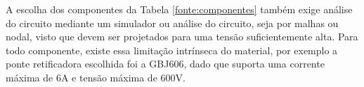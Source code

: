 \documentclass[a4paper,12pt,oneside,openany,table,xcdraw]{article}
\begin{document}
A escolha dos componentes da Tabela \ref{fonte:componentes} também exige análise do circuito mediante um simulador ou análise do circuito, seja por malhas ou nodal, visto que devem ser projetados para uma tensão suficientemente alta. Para todo componente, existe essa limitação intrínseca do material, por exemplo a ponte retificadora escolhida foi a GBJ606, dado que suporta uma corrente máxima de 6A e tensão máxima de 600V.

\end{document}
